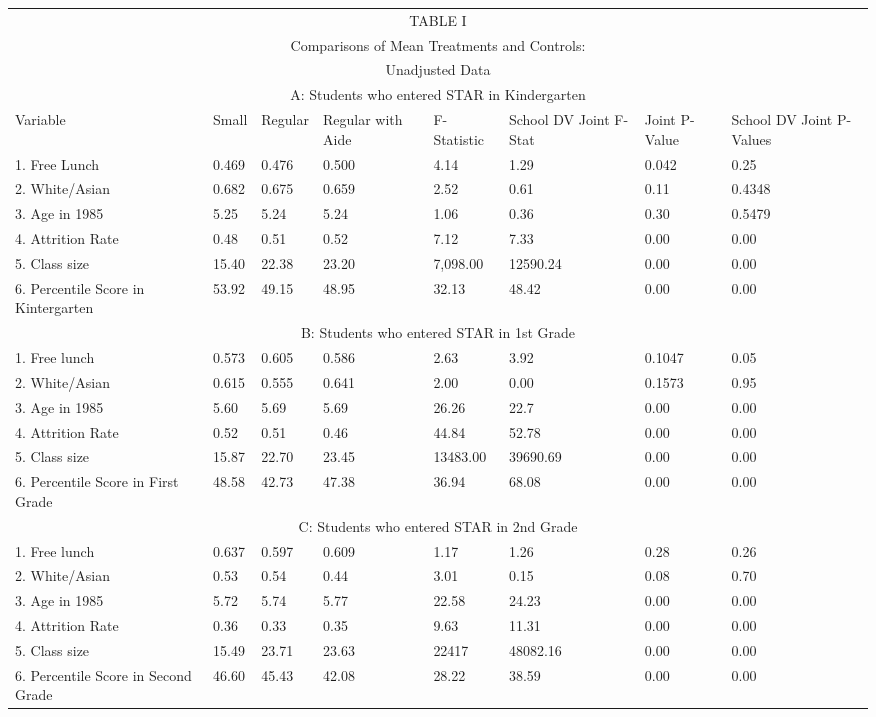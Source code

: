 \begin{tabular}[H]{ |p{4cm}p{1cm}p{1cm}p{1cm}p{1cm}p{1cm}p{1cm}p{1cm}|}
 \hline
 \multicolumn{8}{|c|}{TABLE I} \\
 \multicolumn{8}{|c|}{Comparisons of Mean Treatments and Controls:} \\
 \multicolumn{8}{|c|}{Unadjusted Data} \\
 \hline
 \hline
 \multicolumn{8}{|c|}{A: Students who entered STAR in Kindergarten} \\
 \hline
   Variable &Small & Regular& Regular with Aide & F-Statistic & School DV Joint F-Stat &  Joint P-Value & School DV Joint P-Values\\
 \hline
 \hline

1. Free Lunch& 0.469 &0.476 &0.500&4.14&1.29&0.042&0.25\\
2. White/Asian & 0.682 &0.675 &0.659 &2.52&0.61&0.11&0.4348\\
3. Age in 1985 &5.25 &5.24 &5.24 &1.06&0.36&0.30&0.5479\\
4. Attrition Rate & 0.48 & 0.51 & 0.52 &7.12&7.33&0.00&0.00\\
5. Class size & 15.40 & 22.38 & 23.20 &7,098.00&12590.24&0.00&0.00\\
6. Percentile Score in Kintergarten & 53.92 &49.15 &48.95&32.13&48.42&0.00&0.00\\


\multicolumn{8}{|c|}{B:  Students who entered STAR in 1st Grade}\\
\hline

1. Free lunch & 0.573 & 0.605 & 0.586 &2.63&3.92&0.1047&0.05\\
2. White/Asian & 0.615 & 0.555 & 0.641 &2.00&0.00&0.1573&0.95\\
3. Age in 1985 & 5.60 & 5.69 & 5.69 &26.26&22.7&0.00&0.00\\
4. Attrition Rate & 0.52 & 0.51 & 0.46 &44.84&52.78&0.00&0.00\\
5. Class size & 15.87 & 22.70 & 23.45 &13483.00&39690.69&0.00&0.00\\
6. Percentile Score in First Grade & 48.58 & 42.73 & 47.38 &36.94&68.08&0.00&0.00\\

\multicolumn{8}{|c|}{C:  Students who entered STAR in 2nd Grade}\\
\hline

1. Free lunch & 0.637 & 0.597 & 0.609 &1.17&1.26&0.28&0.26\\
2. White/Asian & 0.53 & 0.54 & 0.44 &3.01&0.15&0.08&0.70\\
3. Age in 1985 & 5.72 & 5.74 & 5.77 &22.58&24.23&0.00&0.00\\
4. Attrition Rate & 0.36 & 0.33 & 0.35 &9.63&11.31&0.00&0.00\\
5. Class size & 15.49 & 23.71 & 23.63 &22417&48082.16&0.00&0.00\\
6. Percentile Score in Second Grade & 46.60 & 45.43 & 42.08 &28.22&38.59&0.00&0.00\\


\end{tabular}
